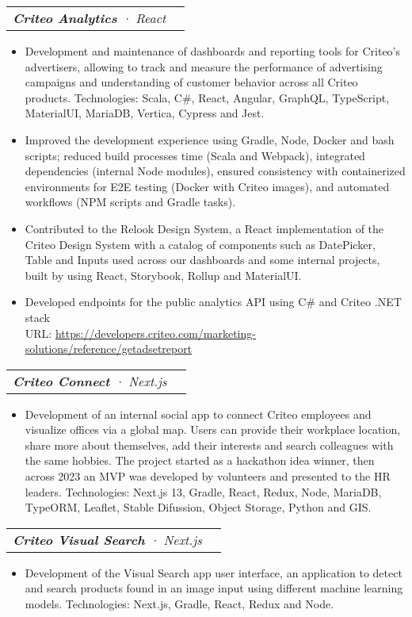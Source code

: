 \documentclass[letterpaper,11pt]{article}
\makeatletter
\newcommand{\resumeItem}[1]{
  \item\small{
    {#1 \vspace{-2pt}}
  }
}
\newcommand{\resumeSubSubheading}[2]{
    \vspace{-2pt}\item
    \begin{tabular*}{0.97\textwidth}{l@{\extracolsep{\fill}}r}
      \textit{\small#1} & \textit{\small #2} \\
    \end{tabular*}\vspace{-7pt}
}
\newcommand{\resumeItemListStart}{\begin{itemize}}
\newcommand{\resumeItemListEnd}{\end{itemize}\vspace{-5pt}}
\makeatother
\begin{document}
    \resumeSubSubheading{\textbf{Criteo Analytics} · React}{}
        \resumeItemListStart
          \resumeItem{Development and maintenance of dashboards and reporting tools for Criteo's advertisers, allowing to track and measure the performance of advertising campaigns and understanding of customer behavior across all Criteo products. Technologies: Scala, C\#, React, Angular, GraphQL, TypeScript, MaterialUI, MariaDB, Vertica, Cypress and Jest.}
          \resumeItem{Improved the development experience using Gradle, Node, Docker and bash scripts; reduced build processes time (Scala and Webpack), integrated dependencies (internal Node modules), ensured consistency with containerized environments for E2E testing (Docker with Criteo images), and automated workflows (NPM scripts and Gradle tasks).}
          \resumeItem{Contributed to the Relook Design System, a React implementation of the Criteo Design System with a catalog of components such as DatePicker, Table and Inputs used across our dashboards and some internal projects, built by using React, Storybook, Rollup and MaterialUI.}
          \resumeItem{Developed endpoints for the public analytics API using C\# and Criteo .NET stack
          \\[1.5pt] URL: {\href{https://developers.criteo.com/marketing-solutions/reference/getadsetreport}{\color{blue}https://developers.criteo.com/marketing-solutions/reference/getadsetreport}}
          }
          \resumeItemListEnd
    
        \resumeSubSubheading{\textbf{Criteo Connect} · Next.js }{}
        \resumeItemListStart
          \resumeItem{Development of an internal social app to connect Criteo employees and visualize offices via a global map. Users can provide their workplace location, share more about themselves, add their interests and search colleagues with the same hobbies. The project started as a hackathon idea winner, then across 2023 an MVP was developed by volunteers and presented to the HR leaders. Technologies: Next.js 13, Gradle, React, Redux, Node, MariaDB, TypeORM, Leaflet, Stable Difussion, Object Storage, Python and GIS.}
          \resumeItemListEnd
      
      \resumeSubSubheading{\textbf{Criteo Visual Search} · Next.js }{}
        \resumeItemListStart
          \resumeItem{Development of the Visual Search app user interface, an application to detect and search products found in an image input using different machine learning models. Technologies: Next.js, Gradle, React, Redux and Node.}
          \resumeItemListEnd
\end{document}
